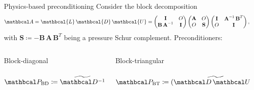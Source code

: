 \documentclass[svgnames]{beamer} %
\newcommand{\vect}[1]{\boldsymbol{\mathbf{#1}}}
\newcommand{\Pbd}{\mathbcal P_{\text{BD}}}
\newcommand{\Pbt}{\mathbcal P_{\text{BT}}}
\begin{document}
	\begin{frame}{Physics-based preconditioning}
		Consider the block decomposition
		\begin{equation*}
		\mathbcal A = \mathbcal{L} \, \mathbcal{D} \, \mathbcal{U} = \begin{pmatrix}
		\vect I & O \\
		\vect B \, \vect A^{-1} & \vect I
		\end{pmatrix}
		\begin{pmatrix}
		\vect A & O \\
		O & \vect S
		\end{pmatrix}
		\begin{pmatrix}
		\vect I & \vect A^{-1} \, \vect B^{T} \\
		O & \vect I
		\end{pmatrix},
		\end{equation*}
		with $\vect S \coloneqq -\vect B \, \vect A \, \vect B^T$ being a pressure Schur complement. 
		\vfill
		Preconditioners:
		\vfill
		\begin{columns}
			\begin{column}{.5\textwidth}
				\begin{block}{Block-diagonal}
					\begin{equation*}
					\Pbd \coloneqq \widetilde{\mathbcal D^{-1}} = \widetilde{\begin{pmatrix}
						\mathbf A & O \\
						O & \mathbf S
						\end{pmatrix}^{-1}}
					\end{equation*}
					\vspace{5pt}
				\end{block}
			\end{column}%
			\begin{column}{.5\textwidth}
				\begin{block}{Block-triangular}
					\begin{equation*}
					\Pbt \coloneqq \widetilde{(\mathbcal D \, \mathbcal U)^{-1}} = \widetilde{\begin{pmatrix}
						\vect A & \vect B^T \\
						O & \vect S
						\end{pmatrix}^{-1}}
					\end{equation*}
					\vspace{5pt}
				\end{block}
			\end{column}
		\end{columns}
		\end{frame}
	
\end{document}

